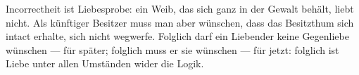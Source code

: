 Incorrectheit ist Liebesprobe: ein Weib, das sich ganz in der Gewalt behält, liebt nicht. Als künftiger Besitzer muss man aber wünschen, dass das Besitzthum sich intact erhalte, sich nicht wegwerfe. Folglich darf ein Liebender keine Gegenliebe wünschen — für später; folglich muss er sie wünschen — für jetzt: folglich ist Liebe unter allen Umständen wider die Logik.
\par

